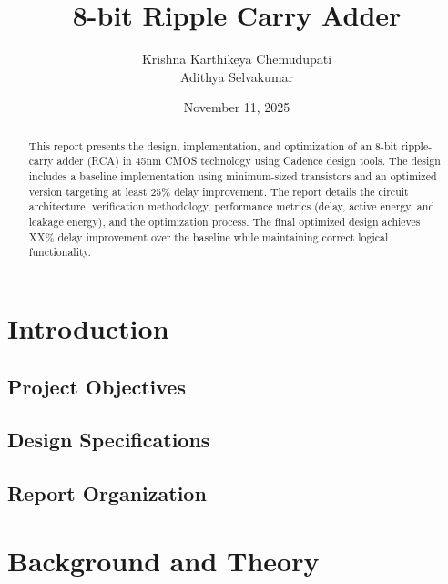 \documentclass[12pt,letterpaper]{article}
\title{\textbf{8-bit Ripple Carry Adder} \\}
\author{Krishna Karthikeya Chemudupati \\ Adithya Selvakumar \\}
\date{November 11, 2025}
\begin{document}
\maketitle
\thispagestyle{empty}

\vspace{1cm}

\begin{abstract}
This report presents the design, implementation, and optimization of an 8-bit ripple-carry adder (RCA) in 45nm CMOS technology using Cadence design tools. The design includes a baseline implementation using minimum-sized transistors and an optimized version targeting at least 25\% delay improvement. The report details the circuit architecture, verification methodology, performance metrics (delay, active energy, and leakage energy), and the optimization process. The final optimized design achieves XX\% delay improvement over the baseline while maintaining correct logical functionality.
\end{abstract}

\newpage

\tableofcontents

\newpage

\section{Introduction}
\label{sec:introduction}


\subsection{Project Objectives}

\subsection{Design Specifications}

\subsection{Report Organization}

\section{Background and Theory}
\label{sec:background}
\end{document}
